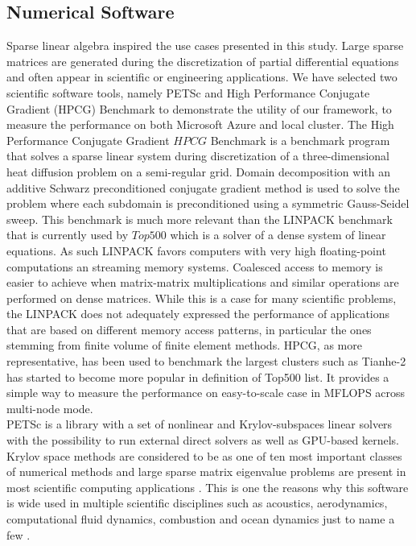 \documentclass[3p,times]{elsarticle}
\begin{document}
\subsection{Numerical Software}
\label{sec:numerical}

Sparse linear algebra inspired the use cases presented in this study. Large sparse matrices are generated during the discretization of partial differential equations and often appear in scientific or engineering applications. We have selected two scientific software tools, namely PETSc and High Performance Conjugate Gradient (HPCG) Benchmark to demonstrate the utility of our framework, to measure the performance on both Microsoft Azure and local cluster. 
The High Performance Conjugate Gradient \(HPCG\) Benchmark \cite{Heroux2013} is a benchmark program that solves a sparse linear system during discretization of a three-dimensional heat diffusion problem on a semi-regular grid. Domain decomposition with an additive Schwarz preconditioned conjugate gradient method is used to solve the problem where each subdomain is preconditioned using a symmetric Gauss-Seidel sweep. This benchmark is much more relevant than the LINPACK benchmark that is currently used by $Top500$ which is a solver of a dense system of linear equations. As such LINPACK favors computers with very high floating-point computations an streaming memory systems. Coalesced access to memory is easier to achieve when matrix-matrix multiplications and similar operations are performed on dense matrices. While this is a case for many scientific problems, the LINPACK does not adequately expressed the performance of applications that are based on different memory access patterns, in particular the ones stemming from finite volume of finite element methods. HPCG, as more representative, has been used to benchmark the largest clusters such as Tianhe-2 \cite{Xianyi2014} has started to become more popular in definition of Top500 list. It provides a simple way to measure the performance on easy-to-scale case in MFLOPS across multi-node mode. \\
PETSc is a library with a set of nonlinear and Krylov-subspaces linear solvers with the possibility to run external direct solvers as well as GPU-based kernels. Krylov space methods are considered to be as one of ten most important classes of numerical methods and large sparse matrix eigenvalue problems are present in most scientific computing applications \cite{Gutknecht2005}. This is one the reasons why this software is wide used in multiple scientific disciplines such as acoustics, aerodynamics, computational fluid dynamics, combustion and ocean dynamics just to name a few \cite{petsc-efficient}.\\
\end{document}
